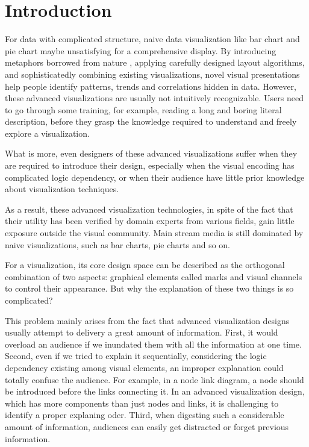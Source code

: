 
\section{Introduction} %
For data with complicated structure, naive data visualization like bar chart and pie chart maybe unsatisfying for a comprehensive display. By introducing metaphors borrowed from nature \cite{cao_whisper:_2012,huron_visual_2013}, applying carefully designed layout algorithms\cite{wu_opinionflow:_2014,chi_morphable_2015}, and sophisticatedly combining existing visualizations\cite{zhao_x0023;fluxflow:_2014}, novel visual presentations help people identify patterns, trends and correlations hidden in data. However, these advanced visualizations are usually not intuitively recognizable. Users need to go through some training, for example, reading a long and boring literal description, before they grasp the knowledge required to understand and freely explore a visualization.\par
What is more, even designers of these advanced visualizations suffer when they are required to introduce their design, especially when the visual encoding has complicated logic dependency, or when their audience have little prior knowledge about visualization techniques.\par
As a result, these advanced visualization technologies, in spite of
the fact that their utility has been verified by domain experts from various fields, gain little exposure outside the visual community. Main stream media is still dominated by naive visualizations, such as bar charts, pie charts and so on.

For a visualization, its core design space can be described as the orthogonal combination of two aspects: graphical elements called marks and visual channels to control their appearance\cite{munzner_visualization_2014}. But why the explanation of these two things is so complicated? 

This problem mainly arises from the fact that advanced visualization designs usually attempt to delivery a great amount of information. First, it would overload an audience if we inundated them with all the information at one time. Second, even if we tried to explain it sequentially, considering the logic dependency existing among visual elements, an improper explanation could totally confuse the audience. For example, in a node link diagram, a node should be introduced before the links connecting it. In an advanced visualization design, which has more components than just nodes and links, it is challenging to identify a proper explaning oder. Third, when digesting such a considerable amount of information, audiences can easily get distracted or forget previous information.   

